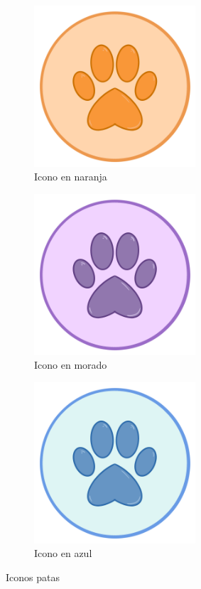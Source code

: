 \documentclass[a4paper, 12pt]{article}
\begin{document}
\begin{figure}[H]
   	\begin{subfigure}{0.48\textwidth}
		\begin{center}
			{\includegraphics[width=6cm]{logo/Pata1.png}\par}
			\caption{Icono en naranja}
		\end{center}  
	\end{subfigure}\hfill
   	\begin{subfigure}{0.48\textwidth}
		\begin{center}
			{\includegraphics[width=6cm]{logo/Pata2.png}\par}
			\caption{Icono en morado}
		\end{center}  
	\end{subfigure}\hfill
   	\begin{subfigure}{0.48\textwidth}
		\begin{center}
			{\includegraphics[width=6cm]{logo/Pata3.png}\par}
			\caption{Icono en azul}
		\end{center}  
	\end{subfigure}\hfill
	\caption{Iconos patas}
\end{figure}
\end{document}
